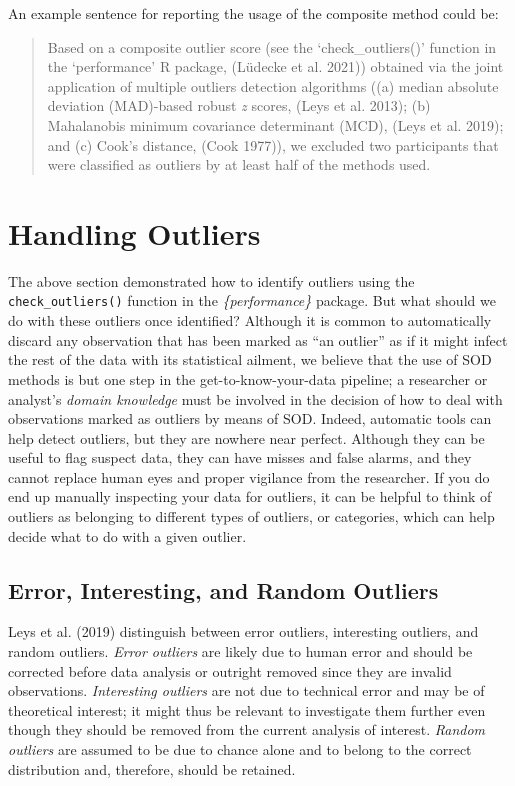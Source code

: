 \documentclass{article}
\begin{document}
An example sentence for reporting the usage of the composite method
could be:

\begin{quote}
Based on a composite outlier score (see the `check\_outliers()' function
in the `performance' R package, (Lüdecke et al. 2021)) obtained via the
joint application of multiple outliers detection algorithms ((a) median
absolute deviation (MAD)-based robust \emph{z} scores, (Leys et al.
2013); (b) Mahalanobis minimum covariance determinant (MCD), (Leys et
al. 2019); and (c) Cook's distance, (Cook 1977)), we excluded two
participants that were classified as outliers by at least half of the
methods used.
\end{quote}

\hypertarget{handling-outliers}{%
\section{Handling Outliers}\label{handling-outliers}}

The above section demonstrated how to identify outliers using the
\texttt{check\_outliers()} function in the \emph{\{performance\}}
package. But what should we do with these outliers once identified?
Although it is common to automatically discard any observation that has
been marked as ``an outlier'' as if it might infect the rest of the data
with its statistical ailment, we believe that the use of SOD methods is
but one step in the get-to-know-your-data pipeline; a researcher or
analyst's \emph{domain knowledge} must be involved in the decision of
how to deal with observations marked as outliers by means of SOD.
Indeed, automatic tools can help detect outliers, but they are nowhere
near perfect. Although they can be useful to flag suspect data, they can
have misses and false alarms, and they cannot replace human eyes and
proper vigilance from the researcher. If you do end up manually
inspecting your data for outliers, it can be helpful to think of
outliers as belonging to different types of outliers, or categories,
which can help decide what to do with a given outlier.

\hypertarget{error-interesting-and-random-outliers}{%
\subsection{Error, Interesting, and Random
Outliers}\label{error-interesting-and-random-outliers}}

Leys et al. (2019) distinguish between error outliers, interesting
outliers, and random outliers. \emph{Error outliers} are likely due to
human error and should be corrected before data analysis or outright
removed since they are invalid observations. \emph{Interesting outliers}
are not due to technical error and may be of theoretical interest; it
might thus be relevant to investigate them further even though they
should be removed from the current analysis of interest. \emph{Random
outliers} are assumed to be due to chance alone and to belong to the
correct distribution and, therefore, should be retained.
\end{document}
